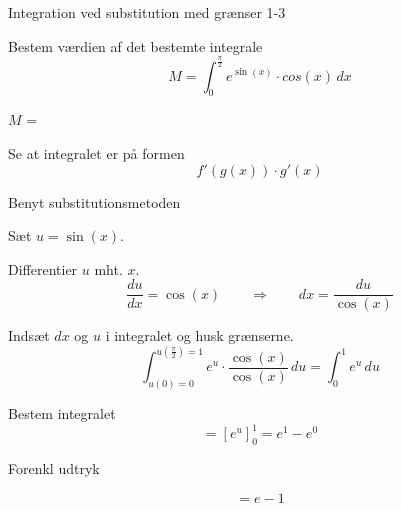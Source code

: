 \documentclass{article}
\begin{document}
\begin{exercise}{Integration ved substitution med grænser 1-3}
	
	
	Bestem værdien af det bestemte integrale
	\[
	M = \int_0^{\frac{\pi}{2}} e^{\sin(x)} \cdot cos(x) \, dx
	\]

	$M$ =  
	
	
	
	\hint
	
	Se at integralet er på formen
	\[
	f'(g(x)) \cdot g'(x)
	\]
	
	\hint
	
	Benyt substitutionsmetoden
	
	\hint
	
	Sæt $u=\sin(x)$.
	
	
	\hint
	
	Differentier $u$ mht. $x$.
	\[
	\frac{du}{dx} = \cos(x) \qquad	\Rightarrow \qquad dx = \frac{du}{\cos(x)}
	\]
	
	\hint
	
	Indsæt $dx$ og $u$ i integralet og husk grænserne.
	\[
	\int_{u(0)=0}^{u(\frac{\pi}{2}) = 1} e^{u} \cdot \frac{\cos(x)}{\cos(x)} \, du = \int_0^1 e^u \, du
	\]
	
	\hint
	
	Bestem integralet
	\[
	=  \left[e^u\right]_0^1 = e^1-e^0
	\]
	
	\hint
	
	Forenkl udtryk
	
	\hint
	
	\[
	= e - 1
	\]
	
	
\end{exercise}

\newpage
\end{document}
